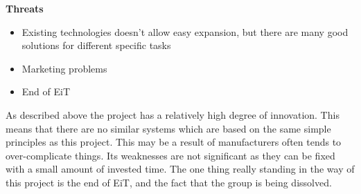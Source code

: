 \textbf{\Large Threats}
\begin{itemize}
	 \item Existing technologies doesn't allow easy expansion, but there are many good solutions for different specific tasks
	 \item Marketing problems 
     \item End of EiT
\end{itemize}

As described above the project has a relatively high degree of innovation. 
This means that there are no similar systems which are based on the same simple principles as this project. 
This may be a result of manufacturers often tends to over-complicate things. 
Its weaknesses are not significant as they can be fixed with a small amount of invested time. 
The one thing really standing in the way of this project is the end of EiT, and the fact that the group is being dissolved. 
